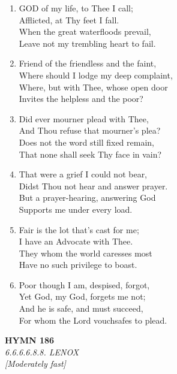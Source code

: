 \documentclass[11pt,a4paper]{article}
\begin{document}
\begin{enumerate}
    \item GOD of my life, to Thee I call; \\
        Afflicted, at Thy feet I fall. \\
        When the great waterfloods prevail, \\
        Leave not my trembling heart to fail.

    \item Friend of the friendless and the faint, \\
        Where should I lodge my deep complaint, \\
        Where, but with Thee, whose open door \\
        Invites the helpless and the poor?

    \item Did ever mourner plead with Thee, \\
        And Thou refuse that mourner's plea? \\
        Does not the word still fixed remain, \\
        That none shall seek Thy face in vain?

    \item That were a grief I could not bear, \\
        Didst Thou not hear and answer prayer. \\
        But a prayer-hearing, answering God \\
        Supports me under every load.

    \item Fair is the lot that's cast for me; \\
        I have an Advocate with Thee. \\
        They whom the world caresses most \\
        Have no such privilege to boast.

    \item Poor though I am, despised, forgot, \\
        Yet God, my God, forgets me not; \\
        And he is safe, and must succeed, \\
        For whom the Lord vouchsafes to plead.

\end{enumerate}

\newpage
\begin{center}
    {\Large \textbf{HYMN 186}}
    \\
    \textit{6.6.6.6.8.8. LENOX}
    \\
    \textit{\small [Moderately fast]}
\end{center}
\vspace{1em}
\end{document}
